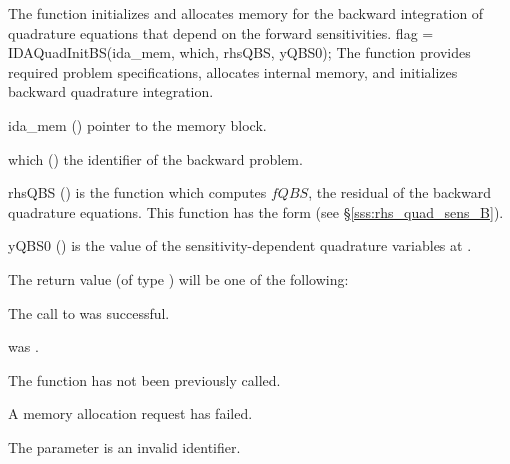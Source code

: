 The function  initializes and allocates memory for the backward
integration of quadrature equations that depend on the forward sensitivities.
{
flag = IDAQuadInitBS(ida\_mem, which, rhsQBS, yQBS0);
}
{
  The function  provides required problem specifications,
  allocates internal memory, and initializes backward quadrature integration.
}
{
  \begin{args}
  \item[ida\_mem] ()
    pointer to the {\idas} memory block.
  \item[which] ()
    the identifier of the backward problem.
  \item[rhsQBS] ()
    is the {\C} function which computes $fQBS$, the residual of the 
    backward quadrature equations. This function has the form 
    (see \S\ref{sss:rhs_quad_sens_B}).
  \item[yQBS0] ()
    is the value of the sensitivity-dependent quadrature variables at .
  \end{args}
}
{
  The return value  (of type ) will be one of the following:
  \begin{args}
  \item[\Id{IDA\_SUCCESS}]
    The call to  was successful.
  \item[\Id{IDA\_MEM\_NULL}] 
     was .
  \item[\Id{IDA\_NO\_ADJ}]
    The function  has not been previously called.
  \item[\Id{IDA\_MEM\_FAIL}] 
    A memory allocation request has failed.
  \item[\Id{IDA\_ILL\_INPUT}]
    The parameter  is an invalid identifier.
  \end{args}
}
{}


